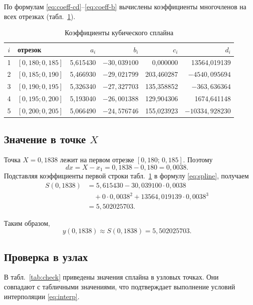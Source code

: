 \documentclass[14pt,a4paper]{extarticle}
\begin{document}
По формулам \eqref{eq:coeff-cd}--\eqref{eq:coeff-b} вычислены
коэффициенты многочленов на всех отрезках (табл.~\ref{tab:coeff}).

\begin{table}[H]
    \centering
    \caption{Коэффициенты кубического сплайна}
    \label{tab:coeff}
    \footnotesize
    \begin{tabular}{clrrrr}
        \toprule
        $i$ & отрезок & $a_i$ & $b_i$ & $c_i$ & $d_i$\\
        \midrule
        1 & $[0{,}180;0{,}185]$ & 5{,}615430 & $-30{,}039100$ & 0{,}000000 & 13564{,}019139\\
        2 & $[0{,}185;0{,}190]$ & 5{,}466930 & $-29{,}021799$ & 203{,}460287 & $-4540{,}095694$\\
        3 & $[0{,}190;0{,}195]$ & 5{,}326340 & $-27{,}327703$ & 135{,}358852 & $-363{,}636364$\\
        4 & $[0{,}195;0{,}200]$ & 5{,}193040 & $-26{,}001388$ & 129{,}904306 & 1674{,}641148\\
        5 & $[0{,}200;0{,}205]$ & 5{,}066490 & $-24{,}576746$ & 155{,}023923 & $-10334{,}928230$\\
        \bottomrule
    \end{tabular}
\end{table}

\subsection{Значение в точке $X$}

Точка $X=0{,}1838$ лежит на первом отрезке
$[0{,}180;\,0{,}185]$. Поэтому
\[
    dx=X-x_1=0{,}1838-0{,}180=0{,}0038.
\]
Подставляя коэффициенты первой строки табл.~\ref{tab:coeff} в
формулу \eqref{eq:spline}, получаем
\begin{align*}
    S(0{,}1838)
    &=5{,}615430-30{,}039100\cdot0{,}0038\\
    &\quad+0\cdot0{,}0038^2
      +13564{,}019139\cdot0{,}0038^3\\
    &=5{,}502025703.
\end{align*}

Таким образом,
\[
    \boxed{y(0{,}1838)\approx S(0{,}1838)=5{,}502025703.}
\]

\subsection{Проверка в узлах}

В табл.~\ref{tab:check} приведены значения сплайна в узловых точках.
Они совпадают с табличными значениями, что подтверждает выполнение
условий интерполяции \eqref{eq:interp}.
\end{document}
